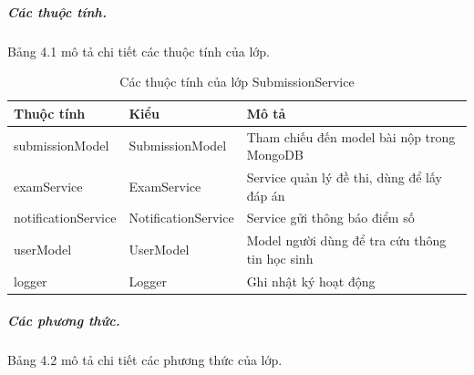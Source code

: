 ﻿\documentclass[../DoAn.tex]{subfiles}
\begin{document}
\subparagraph{Các thuộc tính.} Bảng 4.1 mô tả chi tiết các thuộc tính của lớp.

\begin{table}[H]
\centering
\begin{tabular}{|p{4cm}|p{3.5cm}|p{5cm}|}
\hline
\textbf{Thuộc tính} & \textbf{Kiểu} & \textbf{Mô tả} \\ \hline
submissionModel & SubmissionModel & Tham chiếu đến model bài nộp trong MongoDB \\ \hline
examService & ExamService & Service quản lý đề thi, dùng để lấy đáp án \\ \hline
notificationService & NotificationService & Service gửi thông báo điểm số \\ \hline
userModel & UserModel & Model người dùng để tra cứu thông tin học sinh \\ \hline
logger & Logger & Ghi nhật ký hoạt động \\ \hline
\end{tabular}
\caption{Các thuộc tính của lớp SubmissionService}
\label{table:submission_service_attrs}
\end{table}

\subparagraph{Các phương thức.} Bảng 4.2 mô tả chi tiết các phương thức của lớp.
\end{document}
